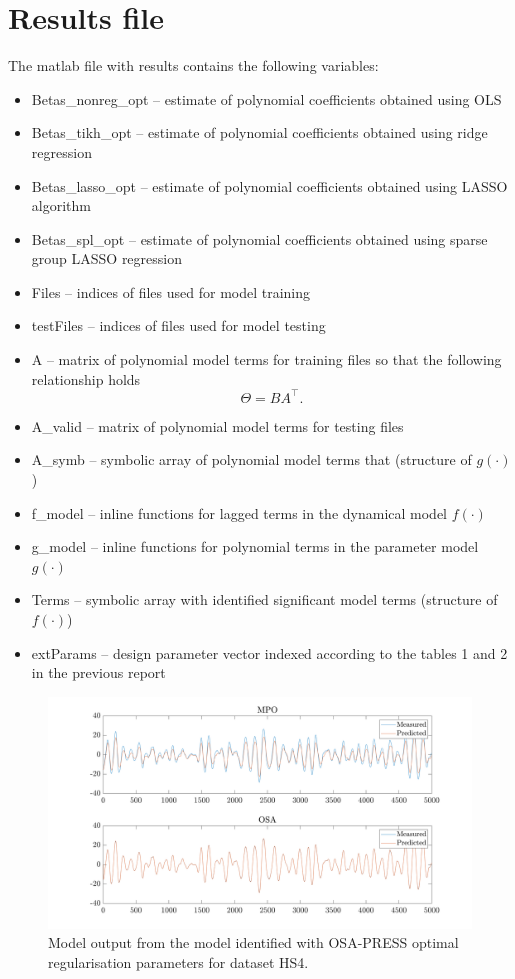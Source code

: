 \documentclass[a4paper,11pt,twoside]{article}
\theoremstyle{mytheoremstyle}
\begin{document}
\section{Results file}
The matlab file with results contains the following variables:
\begin{itemize}
	\item Betas\_nonreg\_opt -- estimate of polynomial coefficients obtained using OLS
	\item Betas\_tikh\_opt -- estimate of polynomial coefficients obtained using ridge regression
	\item Betas\_lasso\_opt -- estimate of polynomial coefficients obtained using LASSO algorithm
	\item Betas\_spl\_opt -- estimate of polynomial coefficients obtained using sparse group LASSO regression
	\item Files -- indices of files used for model training
	\item testFiles -- indices of files used for model testing
	\item A -- matrix of polynomial model terms for training files so that the following relationship holds
	\begin{equation*}
	\Theta = B A^{\top}.
	\end{equation*}
	\item A\_valid -- matrix of polynomial model terms for testing files
	\item A\_symb -- symbolic array of polynomial model terms that (structure of $g(\cdot)$)
	\item f\_model -- inline functions for lagged terms in the dynamical model $f(\cdot)$
	\item g\_model -- inline functions for polynomial terms in the parameter model  $g(\cdot)$
	\item Terms -- symbolic array with identified significant model terms (structure of $f(\cdot)$)
	\item extParams -- design parameter vector indexed according to the tables 1 and 2 in the previous report
\end{itemize}
\begin{figure}[!h]
	\includegraphics[width=\linewidth]{mpo_osa.png}
	\caption{Model output from the model identified with OSA-PRESS optimal regularisation parameters for dataset HS4.}
\end{figure}
\end{document}
